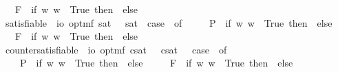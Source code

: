\begin{isabellebody}
\ \ {\isacharbar}\ F{\isacharparenleft}{\isasympsi}{\isacharparenright}\ {\isasymRightarrow}\ if\ {\isasymforall}w{\isachardot}{\isacharparenleft}{\isasympsi}\ w{\isacharparenright}\ {\isasymlongleftrightarrow}\ True\ then\ {\isasymtop}\ else\ {\isasymbottom}\ {\isacharbar}\ {\isacharunderscore}\ {\isasymRightarrow}\ {\isacharasterisk}{\isachardoublequoteclose}\isanewline
\ \isamarkupfalse%
\ satisfiable\ {\isacharcolon}{\isacharcolon}\ {\isachardoublequoteopen}io\ opt{\isasymRightarrow}mf{\isachardoublequoteclose}\ {\isacharparenleft}{\isachardoublequoteopen}{\isacharbrackleft}{\isacharunderscore}{\isacharbrackright}\isactrlsup s\isactrlsup a\isactrlsup t{\isachardoublequoteclose}\ {\isacharbrackleft}{}{\isacharbrackright}{\isacharparenright}\ \ {\isachardoublequoteopen}{\isacharbrackleft}{\isasymphi}{\isacharbrackright}\isactrlsup s\isactrlsup a\isactrlsup t\ {\isasymequiv}\ case\ {\isasymphi}\ of\ \isanewline
\ \ \ \ P{\isacharparenleft}{\isasympsi}{\isacharparenright}\ {\isasymRightarrow}\ if\ {\isasymexists}w{\isachardot}{\isacharparenleft}{\isasympsi}\ w{\isacharparenright}\ {\isasymlongleftrightarrow}\ True\ then\ {\isasymtop}\ else\ {\isasymbottom}\ \isanewline
\ \ {\isacharbar}\ F{\isacharparenleft}{\isasympsi}{\isacharparenright}\ {\isasymRightarrow}\ if\ {\isasymexists}w{\isachardot}{\isacharparenleft}{\isasympsi}\ w{\isacharparenright}\ {\isasymlongleftrightarrow}\ True\ then\ {\isasymtop}\ else\ {\isasymbottom}\ {\isacharbar}\ {\isacharunderscore}\ {\isasymRightarrow}\ {\isacharasterisk}{\isachardoublequoteclose}\isanewline
\ \isamarkupfalse%
\ countersatisfiable\ {\isacharcolon}{\isacharcolon}\ {\isachardoublequoteopen}io\ opt{\isasymRightarrow}mf{\isachardoublequoteclose}\ {\isacharparenleft}{\isachardoublequoteopen}{\isacharbrackleft}{\isacharunderscore}{\isacharbrackright}\isactrlsup c\isactrlsup s\isactrlsup a\isactrlsup t{\isachardoublequoteclose}\ {\isacharbrackleft}{}{\isacharbrackright}{\isacharparenright}\ \ {\isachardoublequoteopen}{\isacharbrackleft}{\isasymphi}{\isacharbrackright}\isactrlsup c\isactrlsup s\isactrlsup a\isactrlsup t\ {\isasymequiv}\ \ case\ {\isasymphi}\ of\ \isanewline
\ \ \ \ P{\isacharparenleft}{\isasympsi}{\isacharparenright}\ {\isasymRightarrow}\ if\ {\isasymexists}w{\isachardot}{\isasymnot}{\isacharparenleft}{\isasympsi}\ w{\isacharparenright}\ {\isasymlongleftrightarrow}\ True\ then\ {\isasymtop}\ else\ {\isasymbottom}\ \isanewline
\ \ {\isacharbar}\ F{\isacharparenleft}{\isasympsi}{\isacharparenright}\ {\isasymRightarrow}\ if\ {\isasymexists}w{\isachardot}{\isasymnot}{\isacharparenleft}{\isasympsi}\ w{\isacharparenright}\ {\isasymlongleftrightarrow}\ True\ then\ {\isasymtop}\ else\ {\isasymbottom}\ {\isacharbar}\ {\isacharunderscore}\ {\isasymRightarrow}\ {\isacharasterisk}{\isachardoublequoteclose}\isanewline

\end{isabellebody}
